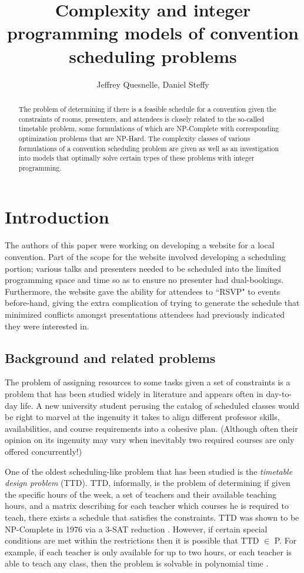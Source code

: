 \documentclass[]{article}
\title{Complexity and integer programming models of convention scheduling problems}
\author{Jeffrey Quesnelle, Daniel Steffy}
\theoremstyle{definition}
\theoremstyle{remark}
\numberwithin{equation}{section}
\begin{document}
\maketitle

\begin{abstract}
The problem of determining if there is a feasible schedule for a convention given the constraints of rooms, presenters, and attendees is closely related to the so-called timetable problem, some formulations of which are NP-Complete with corresponding optimization problems that are NP-Hard. The complexity classes of various formulations of a convention scheduling problem are given as well as an investigation into models that optimally solve certain types of these problems with integer programming.
\end{abstract}

\section{Introduction}

The authors of this paper were working on developing a website for a local convention. Part of the scope for the website involved developing a scheduling portion; various talks and presenters needed to be scheduled into the limited programming space and time so as to ensure no presenter had dual-bookings. Furthermore, the website gave the ability for attendees to ``RSVP" to events before-hand, giving the extra complication of trying to generate the schedule that minimized conflicts amongst presentations attendees had previously indicated they were interested in.

\subsection{Background and related problems}
The problem of assigning resources to some tasks given a set of constraints is a problem that has been studied widely in literature and appears often in day-to-day life. A new university student perusing the catalog of scheduled classes would be right to marvel at the ingenuity it takes to align different professor skills, availabilities, and course requirements into a cohesive plan. (Although often their opinion on its ingenuity may vary when inevitably two required courses are only offered concurrently!)  

One of the oldest scheduling-like problem that has been studied is the \emph{timetable design problem} (TTD). TTD, informally, is the problem of determining if given the specific hours of the week, a set of teachers and their available teaching hours, and a matrix describing for each teacher which courses he is required to teach, there exists a schedule that satisfies the constraints. TTD was shown to be NP-Complete in 1976 via a 3-SAT reduction \cite{even76}. However, if certain special conditions are met within the restrictions then it is possible that TTD $\in$ P. For example, if each teacher is only available for up to two hours, or each teacher is able to teach any class, then the problem is solvable in polynomial time \cite{garey76}.
\end{document}
